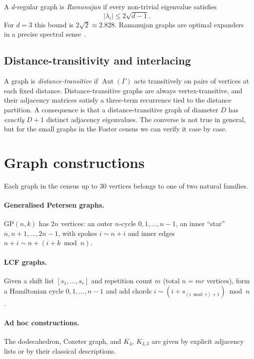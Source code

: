 \documentclass[11pt,a4paper]{article}
\DeclareMathOperator{\Aut}{Aut}
\begin{document}
A $d$-regular graph is \emph{Ramanujan} if every non-trivial eigenvalue satisfies
\[
|\lambda_i| \leq 2\sqrt{d-1}.
\]
For $d = 3$ this bound is $2\sqrt{2} \approx 2.828$. Ramanujan graphs are optimal expanders in a precise spectral sense~\cite{lubotzky1988}.

\subsection{Distance-transitivity and interlacing}

A graph is \emph{distance-transitive} if $\Aut(\Gamma)$ acts transitively on pairs of vertices at each fixed distance. Distance-transitive graphs are always vertex-transitive, and their adjacency matrices satisfy a three-term recurrence tied to the distance partition. A consequence is that a distance-transitive graph of diameter $D$ has \emph{exactly} $D+1$ distinct adjacency eigenvalues. The converse is not true in general, but for the small graphs in the Foster census we can verify it case by case.

\section{Graph constructions}

Each graph in the census up to 30 vertices belongs to one of two natural families.

\paragraph{Generalised Petersen graphs.} $\mathrm{GP}(n,k)$ has $2n$ vertices: an outer $n$-cycle $0,1,\ldots,n-1$, an inner ``star'' $n, n+1, \ldots, 2n-1$, with spokes $i \sim n+i$ and inner edges $n+i \sim n+(i+k \bmod n)$.

\paragraph{LCF graphs.} Given a shift list $[s_1, \ldots, s_r]$ and repetition count $m$ (total $n = mr$ vertices), form a Hamiltonian cycle $0,1,\ldots,n-1$ and add chords $i \sim (i + s_{(i \bmod r)+1}) \bmod n$.

\paragraph{Ad hoc constructions.} The dodecahedron, Coxeter graph, and $K_4$, $K_{3,3}$ are given by explicit adjacency lists or by their classical descriptions.
\end{document}
